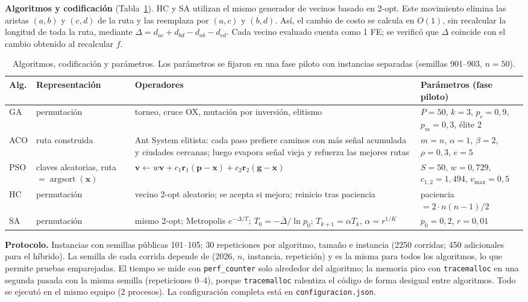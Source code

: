 \documentclass[10pt,a4paper]{article}
\begin{document}
\textbf{Algoritmos y codificación} (Tabla~\ref{tab:alg}). HC y SA utilizan el mismo generador de vecinos basado en 2-opt. Este movimiento elimina las aristas $(a,b)$ y $(c,d)$ de la ruta y las reemplaza por $(a,c)$ y $(b,d)$. Así, el cambio de costo se calcula en $O(1)$, sin recalcular la longitud de toda la ruta, mediante
$\Delta=d_{ac}+d_{bd}-d_{ab}-d_{cd}$. Cada vecino evaluado cuenta como 1 FE; se verificó que $\Delta$ coincide con el cambio obtenido al recalcular $f$.
\begin{table}[H]\centering\small
\begin{tabular}{>{\raggedright}p{1.1cm}>{\raggedright}p{2.6cm}>{\raggedright}p{6.7cm}>{\raggedright\arraybackslash}p{4.6cm}}
\toprule
Alg. & Representación & Operadores & Parámetros (fase piloto)\\
\midrule
GA & permutación & torneo, cruce OX, mutación por inversión, elitismo & $P=50$, $k=3$, $p_c=0{,}9$, $p_m=0{,}3$, élite 2\\
ACO & ruta construida & Ant System elitista: cada paso prefiere caminos con más señal acumulada y ciudades cercanas; luego evapora señal vieja y refuerza las mejores rutas & $m=n$, $\alpha=1$, $\beta=2$, $\rho=0{,}3$, $e=5$\\
PSO & claves aleatorias, ruta $=\operatorname{argsort}(\mathbf x)$ & $\mathbf v\leftarrow w\mathbf v+c_1\mathbf r_1(\mathbf p-\mathbf x)+c_2\mathbf r_2(\mathbf g-\mathbf x)$ & $S=50$, $w=0{,}729$, $c_{1,2}=1{,}494$, $v_{\max}=0{,}5$\\
HC & permutación & vecino 2-opt aleatorio; se acepta si mejora; reinicio tras paciencia & paciencia $=2\cdot n(n-1)/2$\\
SA & permutación & mismo 2-opt; Metropolis $e^{-\Delta/T}$; $T_0=-\bar\Delta/\ln p_0$; $T_{k+1}=\alpha T_k$, $\alpha=r^{1/K}$ & $p_0=0{,}2$, $r=0{,}01$\\
\bottomrule
\end{tabular}
\caption{Algoritmos, codificación y parámetros. Los parámetros se fijaron en una fase piloto con instancias separadas (semillas 901--903, $n=50$).}\label{tab:alg}
\end{table}

\textbf{Protocolo.} Instancias con semillas públicas 101--105; 30 repeticiones por algoritmo, tamaño e instancia (2250 corridas; 450 adicionales para el híbrido).
La semilla de cada corrida depende de (2026, $n$, instancia, repetición) y es la misma para todos los algoritmos, lo que permite pruebas emparejadas.
El tiempo se mide con \texttt{perf\_counter} solo alrededor del algoritmo; la memoria pico con \texttt{tracemalloc} en una segunda pasada con la misma semilla
(repeticiones 0--4), porque \texttt{tracemalloc} ralentiza el código de forma desigual entre algoritmos. Todo se ejecutó en el mismo equipo (2 procesos).
La configuración completa está en \texttt{configuracion.json}.
\end{document}
